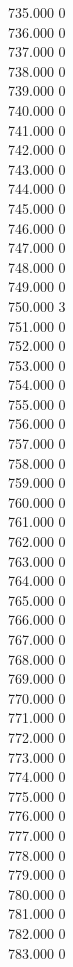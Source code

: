 { 735.000	0 \\
 736.000	0 \\
 737.000	0 \\
 738.000	0 \\
 739.000	0 \\
 740.000	0 \\
 741.000	0 \\
 742.000	0 \\
 743.000	0 \\
 744.000	0 \\
 745.000	0 \\
 746.000	0 \\
 747.000	0 \\
 748.000	0 \\
 749.000	0 \\
 750.000	3 \\
 751.000	0 \\
 752.000	0 \\
 753.000	0 \\
 754.000	0 \\
 755.000	0 \\
 756.000	0 \\
 757.000	0 \\
 758.000	0 \\
 759.000	0 \\
 760.000	0 \\
 761.000	0 \\
 762.000	0 \\
 763.000	0 \\
 764.000	0 \\
 765.000	0 \\
 766.000	0 \\
 767.000	0 \\
 768.000	0 \\
 769.000	0 \\
 770.000	0 \\
 771.000	0 \\
 772.000	0 \\
 773.000	0 \\
 774.000	0 \\
 775.000	0 \\
 776.000	0 \\
 777.000	0 \\
 778.000	0 \\
 779.000	0 \\
 780.000	0 \\
 781.000	0 \\
 782.000	0 \\
 783.000	0 \\
}
